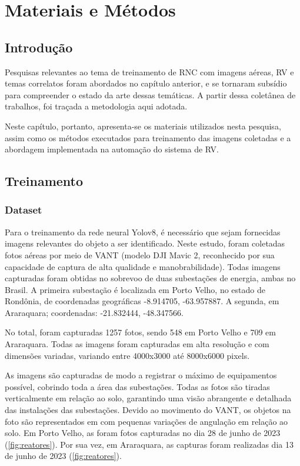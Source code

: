 \chapter{Materiais e Métodos}

\section{Introdução}

Pesquisas relevantes ao tema de treinamento de RNC com imagens aéreas, RV e temas correlatos foram abordados no capítulo anterior, e se tornaram subsídio para compreender o estado da arte dessas temáticas. A partir dessa coletânea de trabalhos, foi traçada a metodologia aqui adotada.

Neste capítulo, portanto, apresenta-se os materiais utilizados nesta pesquisa, assim como os métodos executados para treinamento das imagens coletadas e a abordagem implementada na automação do sistema de RV.

\section{Treinamento}

\subsection{Dataset}

Para o treinamento da rede neural Yolov8, é necessário que sejam fornecidas imagens relevantes do objeto a ser identificado. Neste estudo, foram coletadas fotos aéreas por meio de VANT (modelo DJI Mavic 2, reconhecido por sua capacidade de captura de alta qualidade e manobrabilidade). Todas imagens capturadas foram obtidas no sobrevoo de duas subestações de energia, ambas no Brasil. A primeira subestação é localizada em Porto Velho, no estado de Rondônia, de coordenadas geográficas -8.914705, -63.957887. A segunda, em Araraquara; coordenadas: -21.832444, -48.347566. 

No total, foram capturadas 1257 fotos, sendo  548 em Porto Velho e 709 em Araraquara. Todas as imagens foram capturadas em alta resolução e com dimensões variadas, variando entre 4000x3000 até 8000x6000 pixels. 

As imagens são capturadas de modo a registrar o máximo de equipamentos possível, cobrindo toda a área das subestações. Todas as fotos são tiradas verticalmente em relação ao solo, garantindo uma visão abrangente e detalhada das instalações das subestações. Devido ao movimento do VANT, os objetos na foto são representados em com pequenas variações de angulação em relação ao solo. Em Porto Velho, as foram fotos capturadas no dia 28 de junho de 2023 (\ref{fig:reatores}). Por sua vez, em Araraquara, as capturas foram realizadas dia 13 de junho de 2023 (\ref{fig:reatores}).


